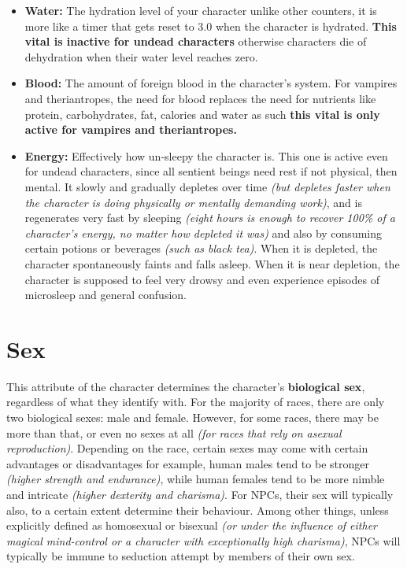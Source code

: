 \documentclass[tikz,openany,11pt,a4paper]{book}
\begin{document}
\begin{itemize}
\item \textbf{Water:} The hydration level of your character \textemdash unlike other counters, it is more like a timer that gets reset to 3.0 when the character is hydrated. \textbf{This vital is inactive for undead characters} \textemdash otherwise characters die of dehydration when their water level reaches zero.
\item \textbf{Blood:} The amount of foreign blood in the character's system. For vampires and theriantropes, the need for blood replaces the need for nutrients like protein, carbohydrates, fat, calories and water \textemdash as such \textbf{this vital is only active for vampires and theriantropes.}
\item \textbf{Energy:} Effectively how un-sleepy the character is. This one is active even for undead characters, since all sentient beings need rest \textemdash if not physical, then mental. It slowly and gradually depletes over time \textit{(but depletes faster when the character is doing physically or mentally demanding work)}, and is regenerates very fast by sleeping \textit{(eight hours is enough to recover 100\% of a character's energy, no matter how depleted it was)} and also by consuming certain potions or beverages  \textit{(such as black tea)}. When it is depleted, the character spontaneously faints and falls asleep. When it is near depletion, the character is supposed to feel very drowsy and even experience episodes of microsleep and general confusion.
\end{itemize}
\section{Sex}
This attribute of the character determines the character's \textbf{biological sex}, regardless of what they identify with. For the majority of races, there are only two biological sexes: male and female. However, for some races, there may be more than that, or even no sexes at all \textit{(for races that rely on asexual reproduction)}.\newline
Depending on the race, certain sexes may come with certain advantages or disadvantages \textemdash for example, human males tend to be stronger \textit{(higher strength and endurance)}, while human females tend to be more nimble and intricate \textit{(higher dexterity and charisma)}.
For NPCs, their sex will typically also, to a certain extent determine their behaviour. Among other things, unless explicitly defined as homosexual or bisexual \textit{(or under the influence of either magical mind-control or a character with exceptionally high charisma)}, NPCs will typically be immune to seduction attempt by members of their own sex.
\end{document}
